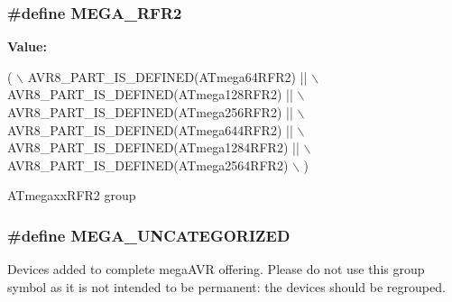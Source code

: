 \subsubsection[{M\+E\+G\+A\+\_\+\+R\+F\+R2}]{\setlength{\rightskip}{0pt plus 5cm}\#define M\+E\+G\+A\+\_\+\+R\+F\+R2}\label{group__mega__part__macros__group_gaa5278eedfdfffaeb7c2c49aff7c2eb97}
{\bfseries Value\+:}
\begin{DoxyCode}
( \(\backslash\)
        AVR8\_PART\_IS\_DEFINED(ATmega64RFR2)   || \(\backslash\)
        AVR8\_PART\_IS\_DEFINED(ATmega128RFR2)  || \(\backslash\)
        AVR8\_PART\_IS\_DEFINED(ATmega256RFR2)  || \(\backslash\)
        AVR8\_PART\_IS\_DEFINED(ATmega644RFR2)  || \(\backslash\)
        AVR8\_PART\_IS\_DEFINED(ATmega1284RFR2) || \(\backslash\)
        AVR8\_PART\_IS\_DEFINED(ATmega2564RFR2) \(\backslash\)
        )
\end{DoxyCode}
A\+Tmegaxx\+R\+F\+R2 group \hypertarget{group__mega__part__macros__group_ga9252d02a9216d5e9bf94000667ad6cb1}{}
\subsubsection[{M\+E\+G\+A\+\_\+\+U\+N\+C\+A\+T\+E\+G\+O\+R\+I\+Z\+E\+D}]{\setlength{\rightskip}{0pt plus 5cm}\#define M\+E\+G\+A\+\_\+\+U\+N\+C\+A\+T\+E\+G\+O\+R\+I\+Z\+E\+D}\label{group__mega__part__macros__group_ga9252d02a9216d5e9bf94000667ad6cb1}
Devices added to complete mega\+A\+V\+R offering. Please do not use this group symbol as it is not intended to be permanent\+: the devices should be regrouped. \hypertarget{group__mega__part__macros__group_gaabb3078f36ad4d875915bd54fa46f337}{}
